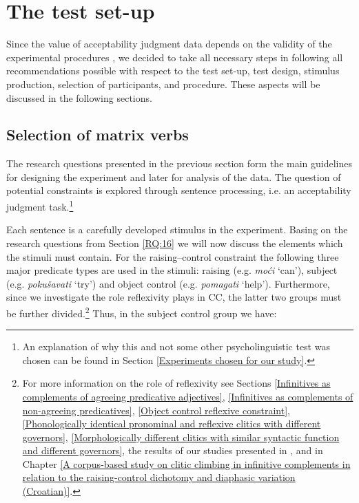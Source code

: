 \section{The test set-up}
\label{The test set-up}

Since the value of acceptability judgment data depends on the validity of the experimental procedures \citep[cf.][]{Myers17}, we decided to take all necessary steps in following all recommendations possible with respect to the test set-up, test design, stimulus production, selection of participants, and procedure. These aspects will be discussed in the following sections.

\subsection{Selection of matrix verbs}
\label{Selection of matrix verbs}

The research questions presented in the previous section form the main guidelines for designing the experiment and later for analysis of the data. The question of potential constraints is explored through sentence processing, i.e. an acceptability judgment task.\footnote{An explanation of why this and not some other psycholinguistic test was chosen can be found in Section \ref{Experiments chosen for our study}.}

Each sentence is a carefully developed stimulus in the experiment. Basing on the research questions from Section \ref{RQ:16} we will now discuss the elements which the stimuli must contain. For the raising--control constraint the following three major predicate types are used in the stimuli: raising (e.g. \textit{moći} ‘can’), subject (e.g. \textit{pokušavati} ‘try’) and object control (e.g. \textit{pomagati} ‘help’). Furthermore, since we investigate the role reflexivity plays in CC, the latter two groups must be further divided.\footnote{For more information on the role of reflexivity see Sections \ref{Infinitives as complements of agreeing predicative adjectives}, \ref{Infinitives as complements of non-agreeing predicatives}, \ref{Object control reflexive constraint}, \ref{Phonologically identical pronominal and reflexive clitics with different governors}, \ref{Morphologically different clitics with similar syntactic function and different governors}, the results of our studies presented in \citet*{HKJ18}, and in Chapter \ref{A corpus-based study on clitic climbing in infinitive complements in relation to the raising-control dichotomy and diaphasic variation (Croatian)}.} Thus, in the subject control group we have:

